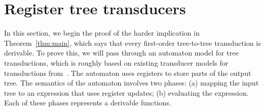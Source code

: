 


\section{Register tree transducers}
\label{sec:stt}
In this section, we begin the proof of the harder implication in Theorem~\ref{thm:main}, which says that every first-order tree-to-tree transduction is derivable. To prove this, we will pass through an automaton model for tree transductions, which  is roughly based on existing transducer models for \mso transductions from~\cite{bloem_comparison_2000,alur2017streaming}.
The automaton  uses registers to store parts of the output tree. The semantics of the automaton involves two phases: (a) mapping the input tree to an expression that uses register updates; (b) evaluating the expression. Each of these  phases represents a derivable functions.

%
%


